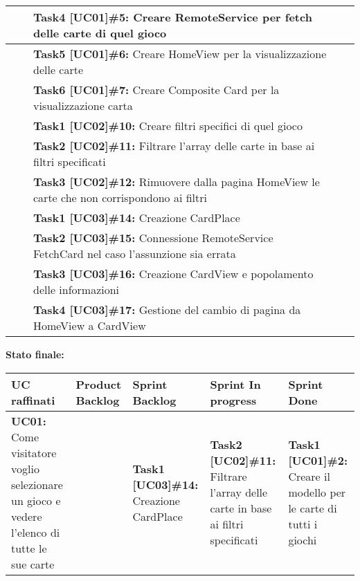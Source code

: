 \documentclass{article}
\begin{document}
\begin{itemize}
\begin{tabular}{ | p{3.5cm} | p{1.5cm} | p{5cm} | p{1.6cm} | p{1.6cm} | }
            \hline
            & & \textbf{Task4 [UC01]\#5:} Creare RemoteService per fetch delle carte di quel gioco & & \\
            \hline
            & & \textbf{Task5 [UC01]\#6:} Creare HomeView per la visualizzazione delle carte & & \\
            \hline
            & & \textbf{Task6 [UC01]\#7:} Creare Composite Card per la visualizzazione carta & & \\
            \hline
            & & \textbf{Task1 [UC02]\#10:} Creare filtri specifici di quel gioco & & \\
            \hline
            & & \textbf{Task2 [UC02]\#11:} Filtrare l'array delle carte in base ai filtri specificati & & \\
            \hline
            & & \textbf{Task3 [UC02]\#12:} Rimuovere dalla pagina HomeView le carte che non corrispondono ai filtri & & \\
            \hline
            & & \textbf{Task1 [UC03]\#14:} Creazione CardPlace & & \\
            \hline
            & & \textbf{Task2 [UC03]\#15:} Connessione RemoteService FetchCard nel caso l'assunzione sia errata & & \\
            \hline
            & & \textbf{Task3 [UC03]\#16:} Creazione CardView e popolamento delle informazioni & & \\
            \hline
            & & \textbf{Task4 [UC03]\#17:} Gestione del cambio di pagina da HomeView a CardView & & \\
            \hline
        \end{tabular}
        \newpage
        \textbf{Stato finale:}
        \newline
        \newline
        \begin{tabular}{ | p{2.4cm} | p{1.4cm} | p{2.7cm} | p{3.4cm} | p{3cm} | }
            \hline
            \textbf{UC raffinati}
            & \textbf{Product Backlog}
            & \textbf{Sprint Backlog}
            & \textbf{Sprint In progress}
            & \textbf{Sprint Done} \\
            \hline
            \textbf{UC01:} Come visitatore voglio selezionare un gioco e vedere l'elenco di tutte le sue carte
            & & \textbf{Task1 [UC03]\#14:} Creazione CardPlace
            & \textbf{Task2 [UC02]\#11:} Filtrare l'array delle carte in base ai filtri specificati
            & \textbf{Task1 [UC01]\#2:} Creare il modello per le carte di tutti i giochi \\

\end{tabular}
\end{itemize}
\end{document}
